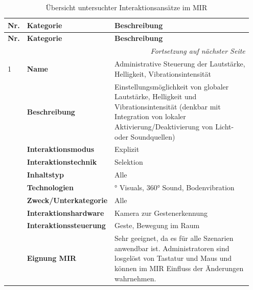 \begin{longtable}{p{0.03\linewidth} p{0.27\linewidth}
    >{\raggedright\arraybackslash}p{0.65\linewidth}}
    \caption{Übersicht untersuchter Interaktionsansätze im MIR} \label{tab:interaktionsansatz} \\

    \toprule
    \textbf{Nr.} & \textbf{Kategorie} & \textbf{Beschreibung} \\
    \midrule
    \endfirsthead

    \toprule
    \textbf{Nr.} & \textbf{Kategorie} & \textbf{Beschreibung} \\
    \midrule
    \endhead

    \midrule
    \multicolumn{3}{r}{\textit{Fortsetzung auf nächster Seite}} \\
    \endfoot

    \bottomrule
    \endlastfoot

    1   & \textbf{Name} & Administrative Steuerung der Lautstärke, Helligkeit, Vibrationsintensität \\
        & \textbf{Beschreibung} & Einstellungsmöglichkeit von globaler Lautstärke, Helligkeit und Vibrationsintensität (denkbar mit Integration von lokaler Aktivierung/Deaktivierung von Licht- oder Soundquellen)  \\
        & \textbf{Interaktionsmodus} & Explizit \\
        & \textbf{Interaktionstechnik} & Selektion \\
        & \textbf{Inhaltstyp} & Alle \\
        & \textbf{Technologien} & 270° Visuals, 360° Sound, Bodenvibration \\
        & \textbf{Zweck/Unterkategorie} & Alle \\
        & \textbf{Interaktionshardware} & Kamera zur Gestenerkennung \\
        & \textbf{Interaktionssteuerung} & Geste, Bewegung im Raum \\
        & \textbf{Eignung MIR} & Sehr geeignet, da es für alle Szenarien anwendbar ist. Administratoren sind losgelöst von Tastatur und Maus und können im MIR Einfluss der Änderungen wahrnehmen. \\
        \midrule


\end{longtable}
